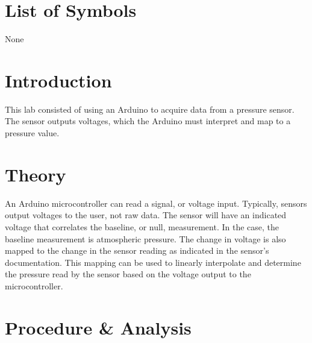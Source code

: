 \documentclass[12pt]{article}
\begin{document}

\tableofcontents

\listoffigures

\bigskip


\section*{\fontsize{12}{12}\selectfont \large List of Symbols}
None




\newpage



\section*{\fontsize{12}{12}\selectfont \large Introduction}

This lab consisted of using an Arduino to acquire data from a pressure sensor. The sensor outputs voltages, which the Arduino must interpret and map to a pressure value.

\section*{\fontsize{12}{12}\selectfont \large Theory}

An Arduino microcontroller can read a signal, or voltage input. Typically, sensors output voltages to the user, not raw data. The sensor will have an indicated voltage that correlates the baseline, or null, measurement. In the case, the baseline measurement is atmospheric pressure. The change in voltage is also mapped to the change in the sensor reading as indicated in the sensor's documentation. This mapping can be used to linearly interpolate and determine the pressure read by the sensor based on the voltage output to the microcontroller.
\bigskip


\section*{\fontsize{12}{12}\selectfont \large Procedure \& Analysis}
\end{document}
